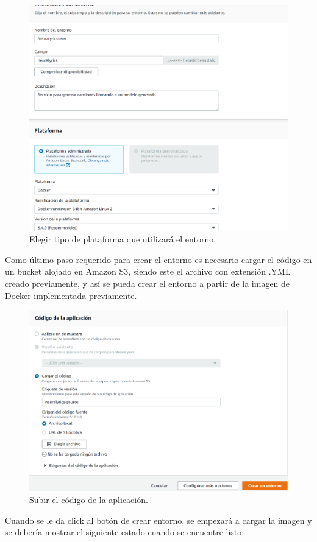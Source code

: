 \documentclass[12pt, a4paper, titlepage]{article}
\begin{document}
		\begin{figure}[H]
			\includegraphics[width=12cm]{./Imagenes/BackEnd/paso_3.png}
			\centering 
			\caption{Elegir tipo de plataforma que utilizará el entorno.}
		\end{figure}
		Como último paso requerido para crear el entorno es necesario cargar el código en un bucket alojado en Amazon S3, siendo este el archivo con extensión .YML creado previamente, y así se pueda crear el entorno a partir de la imagen de Docker implementada previamente.
		\begin{figure}[H]
			\includegraphics[width=12cm]{./Imagenes/BackEnd/paso_4.png}
			\centering 
			\caption{Subir el código de la aplicación.}
		\end{figure}
		Cuando se le da click al botón de crear entorno, se empezará a cargar la imagen y se debería mostrar el siguiente estado cuando se encuentre listo:
\end{document}
